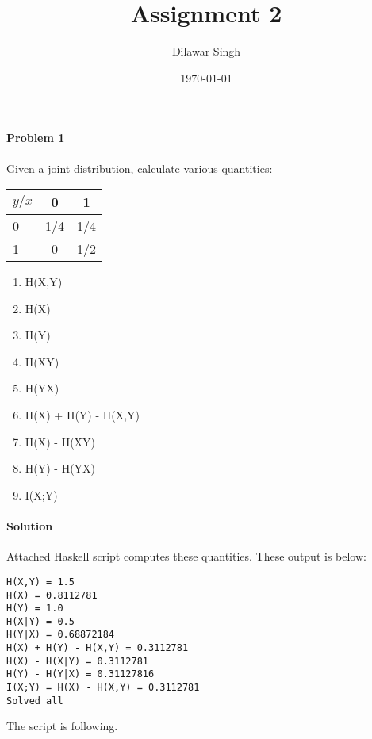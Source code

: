 \documentclass[]{article}
\title{Assignment 2}
\author{Dilawar Singh}
\date{\today}
\begin{document}
\maketitle

\paragraph{Problem 1}

Given a joint distribution, calculate various quantities:

\begin{tabular}[c]{l|c c}
\(y/x\) & 0 & 1 \\
\hline
0 & 1/4 & 1/4 \\
1 & 0 & 1/2 \\
\hline
\end{tabular}

\begin{enumerate}
\item H(X,Y)
\item H(X)
\item H(Y)
\item H(X\textbar{}Y)
\item H(Y\textbar{}X)
\item H(X) + H(Y) - H(X,Y)
\item H(X) - H(X\textbar{}Y)
\item H(Y) - H(Y\textbar{}X)
\item I(X;Y)
\end{enumerate}

\paragraph*{Solution}

Attached Haskell script computes these quantities. These output is below:

\begin{lstlisting}
H(X,Y) = 1.5 
H(X) = 0.8112781
H(Y) = 1.0
H(X|Y) = 0.5
H(Y|X) = 0.68872184
H(X) + H(Y) - H(X,Y) = 0.3112781
H(X) - H(X|Y) = 0.3112781
H(Y) - H(Y|X) = 0.31127816
I(X;Y) = H(X) - H(X,Y) = 0.3112781
Solved all
\end{lstlisting}

The script is following.

\end{document}
